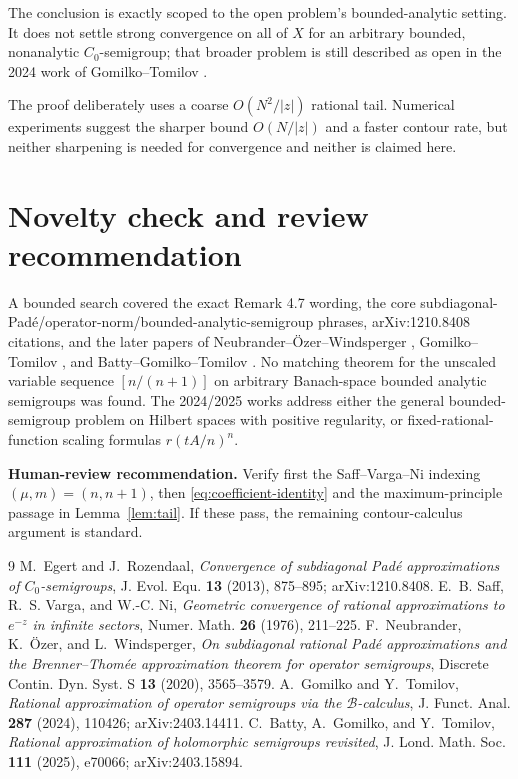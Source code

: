 \documentclass[11pt]{article}
\begin{document}
The conclusion is exactly scoped to the open problem's bounded-analytic
setting. It does not settle strong convergence on all of $X$ for an arbitrary
bounded, nonanalytic $C_0$-semigroup; that broader problem is still described
as open in the 2024 work of Gomilko--Tomilov \cite{GomilkoTomilov}.

The proof deliberately uses a coarse $O(N^2/|z|)$ rational tail. Numerical
experiments suggest the sharper bound $O(N/|z|)$ and a faster contour rate,
but neither sharpening is needed for convergence and neither is claimed here.

\section{Novelty check and review recommendation}
A bounded search covered the exact Remark 4.7 wording, the core
subdiagonal-Pad\'e/operator-norm/bounded-analytic-semigroup phrases,
arXiv:1210.8408 citations, and the later papers of
Neubrander--\"Ozer--Windsperger \cite{NeubranderOzerWindsperger},
Gomilko--Tomilov \cite{GomilkoTomilov}, and
Batty--Gomilko--Tomilov \cite{BattyGomilkoTomilov}. No matching theorem for
the unscaled variable sequence $[n/(n+1)]$ on arbitrary Banach-space bounded
analytic semigroups was found. The 2024/2025 works address either the general
bounded-semigroup problem on Hilbert spaces with positive regularity, or
fixed-rational-function scaling formulas $r(tA/n)^n$.

\textbf{Human-review recommendation.} Verify first the Saff--Varga--Ni
indexing $(\mu,m)=(n,n+1)$, then \eqref{eq:coefficient-identity} and the
maximum-principle passage in Lemma~\ref{lem:tail}. If these pass, the
remaining contour-calculus argument is standard.

\begin{thebibliography}{9}
M.~Egert and J.~Rozendaal,
\emph{Convergence of subdiagonal Pad\'e approximations of $C_0$-semigroups},
J. Evol. Equ. \textbf{13} (2013), 875--895; arXiv:1210.8408.
E.~B. Saff, R.~S. Varga, and W.-C. Ni,
\emph{Geometric convergence of rational approximations to $e^{-z}$ in
infinite sectors}, Numer. Math. \textbf{26} (1976), 211--225.
F.~Neubrander, K.~\"Ozer, and L.~Windsperger,
\emph{On subdiagonal rational Pad\'e approximations and the Brenner--Thom\'ee
approximation theorem for operator semigroups},
Discrete Contin. Dyn. Syst. S \textbf{13} (2020), 3565--3579.
A.~Gomilko and Y.~Tomilov,
\emph{Rational approximation of operator semigroups via the
$\mathcal B$-calculus}, J. Funct. Anal. \textbf{287} (2024), 110426;
arXiv:2403.14411.
C.~Batty, A.~Gomilko, and Y.~Tomilov,
\emph{Rational approximation of holomorphic semigroups revisited},
J. Lond. Math. Soc. \textbf{111} (2025), e70066; arXiv:2403.15894.
\end{thebibliography}
\end{document}
